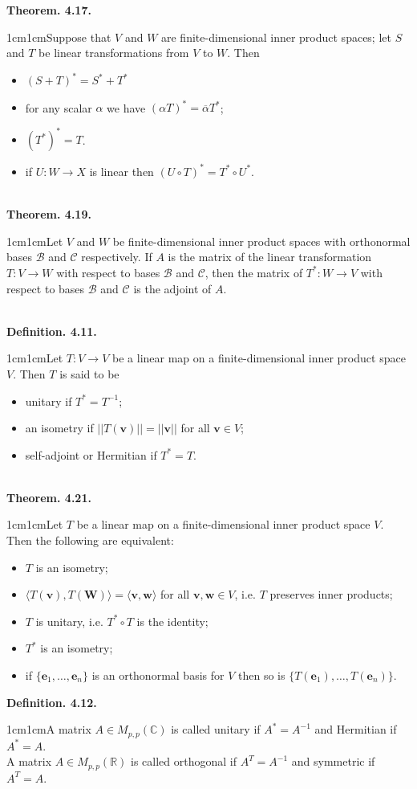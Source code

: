 \documentclass{article}
\newcommand{\vect}[1]{\mathbf{#1}}
\newcommand{\definition}[2]{\textbf{Definition. #1.}\begin{adjustwidth}{1cm}{1cm}#2\end{adjustwidth}}
\newcommand{\theorem}[2]{\textbf{Theorem. #1.}\begin{adjustwidth}{1cm}{1cm}#2\end{adjustwidth}}
\begin{document}
\theorem{4.17}{Suppose that $V$ and $W$ are finite-dimensional inner product spaces; let $S$ and $T$ be linear transformations from $V$ to $W$. Then
\begin{itemize}
  \item $(S+T)^* = S^* + T^*$
  \item for any scalar $\alpha$ we have $(\alpha T)^* = \overline{\alpha}T^*$;
  \item $(T^*)^* = T$.
  \item if $U: W \rightarrow X$ is linear then $(U \circ T)^* = T^* \circ U^*$.
\end{itemize}}~\\
\theorem{4.19}{Let $V$ and $W$ be finite-dimensional inner product spaces with orthonormal bases $\mathcal{B}$ and $\mathcal{C}$ respectively. If $A$ is the matrix of the linear transformation $T: V \rightarrow W$ with respect to bases $\mathcal{B}$ and $\mathcal{C}$, then the matrix of $T^*: W \rightarrow V$ with respect to bases $\mathcal{B}$ and $\mathcal{C}$ is the adjoint of $A$.}~\\
\definition{4.11}{Let $T: V \rightarrow V$ be a linear map on a finite-dimensional inner product space $V$. Then $T$ is said to be
\begin{itemize}
  \item unitary if $T^* = T^{-1}$;
  \item an isometry if $||T(\vect{v})|| = ||\vect{v}||$ for all $\vect{v} \in V$;
  \item self-adjoint or Hermitian if $T^* = T$.
\end{itemize}}~\\
\theorem{4.21}{Let $T$ be a linear map on a finite-dimensional inner product space $V$. Then the following are equivalent:
\begin{itemize}
  \item $T$ is an isometry;
  \item $\langle T(\vect{v}), T(\vect{W}) \rangle = \langle \vect{v}, \vect{w} \rangle$ for all $\vect{v}, \vect{w} \in V$, i.e. $T$ preserves inner products;
  \item $T$ is unitary, i.e. $T^* \circ T$ is the identity;
  \item $T^*$ is an isometry;
  \item if $\{ \vect{e}_1, \ldots, \vect{e}_n \}$ is an orthonormal basis for $V$ then so is $\{T(\vect{e}_1), \ldots, T(\vect{e}_n) \}$.
\end{itemize}}\newpage
\definition{4.12}{A matrix $A \in M_{p,p}(\mathbb{C})$ is called unitary if $A^* = A^{-1}$ and Hermitian if $A^* = A$.\\A matrix $A \in M_{p,p}(\mathbb{R})$ is called orthogonal if $A^T = A^{-1}$ and symmetric if $A^T = A$.}~\\
\end{document}
